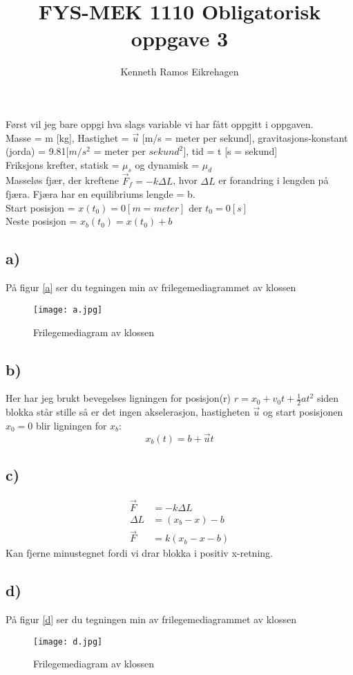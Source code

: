 \documentclass[a4paper,12pt,norsk]{article}
\title{FYS-MEK 1110 Obligatorisk oppgave 3}
\author{Kenneth Ramos Eikrehagen}
\begin{document}
\maketitle
\tableofcontents
Først vil jeg bare oppgi hva slags variable vi har fått oppgitt i oppgaven.\\
Masse = m [kg], Hastighet = $\vec{u}$ [m/s = meter per sekund], gravitasjons-konstant (jorda) = 9.81$[m/s^2$ = meter per $sekund^2]$, tid = t [s = sekund] \\
Friksjons krefter, statisk = $\mu_s$ og dynamisk = $\mu_d$\\
Masseløs fjær, der kreftene $\vec{F}_f = -k\Delta{L}$, hvor $\Delta{L}$ er forandring i lengden på fjæra. Fjæra har en equilibriums lengde = b.\\
Start posisjon = $x(t_0)=0[m = meter]$ der $t_0 = 0[s]$\\
Neste posisjon = $x_b(t_0) = x(t_0) + b$

\subsection*{a)}
På figur \vref{a} ser du tegningen min av frilegemediagrammet av klossen

\begin{figure}[h!]
\texttt{[image: a.jpg]} 
\caption{Frilegemediagram av klossen}
\label{a}
\end{figure} 

\subsection*{b)}
Her har jeg brukt bevegelses ligningen for posisjon(r) $r = x_0 + v_0t + \frac{1}{2}at^2$ siden blokka står stille så er det ingen akselerasjon, hastigheten $\vec{u}$ og start posisjonen $x_0 = 0$ blir ligningen for $x_b$:
$$x_b(t) = b + \vec{u}t$$

\subsection*{c)}
\begin{align*}
\vec{F} &= -k\Delta{L}\\
\Delta{L} &= (x_b - x) - b\\
\vec{F} &= k(x_b-x-b)
\end{align*}
Kan fjerne minustegnet fordi vi drar blokka i positiv x-retning.

\subsection*{d)}
På figur \vref{d} ser du tegningen min av frilegemediagrammet av klossen
\begin{figure}[h!]
\texttt{[image: d.jpg]} 
\caption{Frilegemediagram av klossen}
\label{d}
\end{figure}
 
\end{document}
